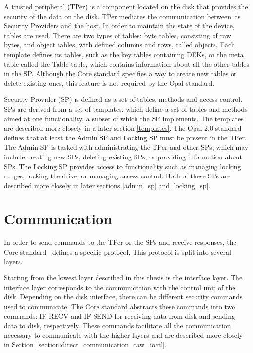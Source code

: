 
A trusted peripheral (TPer) is a component located on the disk that provides the security of the data on the disk. 
TPer mediates the communication between its Security Providers and the host.
In order to maintain the state of the device, tables are used.
There are two types of tables: byte tables, consisting of raw bytes, and object tables, with defined columns and rows, called objects.
Each template defines its tables, such as the key tables containing DEKs, or the meta table called the Table table, which contains information about all the other tables in the SP.
Although the Core standard specifies a way to create new tables or delete existing ones, this feature is not required by the Opal standard.

Security Provider (SP) is defined as a set of tables, methods and access control. SPs are derived from a set of templates, which define a set of tables and methods aimed at one functionality, a subset of which the SP implements. The templates are described more closely in a later section \ref{templates}.
The Opal 2.0 standard defines that at least the Admin SP and Locking SP must be present in the TPer. The Admin SP is tasked with administrating the TPer and other SPs, which may include creating new SPs, deleting existing SPs, or providing information about SPs. The Locking SP provides access to functionality such as managing locking ranges, locking the drive, or managing access control. Both of these SPs are described more closely in later sections \ref{admin_sp} and \ref{locking_sp}.



\section{Communication}
\label{opal_communication}

In order to send commands to the TPer or the SPs and receive responses, the Core standard~\cite{tcg-storage-core} defines a specific protocol.
This protocol is split into several layers.

Starting from the lowest layer described in this thesis is the interface layer. The interface layer corresponds to the communication with the control unit of the disk. Depending on the disk interface, there can be different security commands used to communicate. The Core standard abstracts these commands into two commands: IF-RECV and IF-SEND for receiving data from disk and sending data to disk, respectively. These commands facilitate all the communication necessary to communicate with the higher layers and are described more closely in Section~\ref{section:direct_communication_raw_ioctl}.


